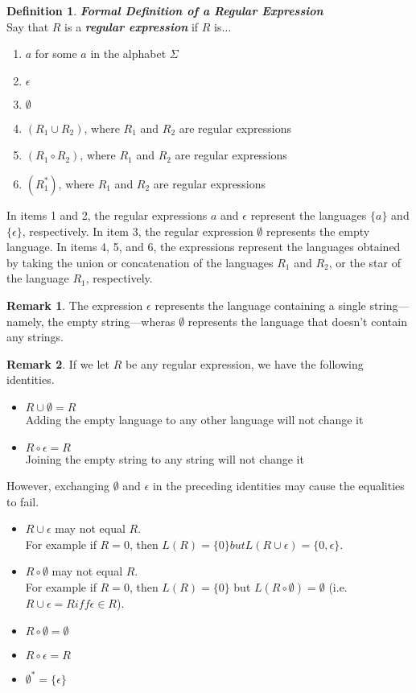 \documentclass{article}
\theoremstyle{definition}
\newtheorem{definition}{Definition}[section]
\newtheorem*{remark}{Remark}
\newcommand{\define}[1]{\textbf{\textit{#1}}}
\begin{document}
\begin{definition}{\define{Formal Definition of a Regular Expression}}
  \\ Say that $R$ is a \define{regular expression} if $R$ is$\dots$ 
  \begin{enumerate}
    \item $a$ for some $a$ in the alphabet $\Sigma$ 
    \item $\epsilon$ 
    \item $\emptyset$ 
    \item $(R_1 \cup R_2)$, where $R_1$ and $R_2$ are regular expressions 
    \item $(R_1 \circ R_2)$, where $R_1$ and $R_2$ are regular expressions 
    \item $(R_{1}^{*})$, where $R_1$ and $R_2$ are regular expressions 
  \end{enumerate}
  In items 1 and 2, the regular expressions $a$ and $\epsilon$ represent the languages $\{a\}$ and $\{\epsilon \}$, respectively. In item 3, the regular expression $\emptyset$ represents the empty language. In items 4, 5, and 6, the expressions represent the languages obtained by taking the union or concatenation of the languages $R_1$ and $R_2$, or the star of the language $R_1$, respectively.  
\end{definition}

\begin{remark}
  The expression $\epsilon$ represents the language containing a single string---namely, the empty string---wheras $\emptyset$ represents the language that doesn't contain any strings. 
\end{remark}

\begin{remark}
  If we let $R$ be any regular expression, we have the following identities. 
  \begin{itemize}
    \item $R \cup \emptyset = R$ \\ Adding the empty language to any other language will not change it 
    \item $R \circ \epsilon = R$ \\ Joining the empty string to any string will not change it
  \end{itemize}
  However, exchanging $\emptyset$ and $\epsilon$ in the preceding identities may cause the equalities to fail. 
  \begin{itemize}
    \item $R \cup \epsilon$ may not equal $R$. \\ For example if $R = 0$, then $L(R) = \{0\} but L(R \cup \epsilon) = \{0,\epsilon \}$. 
    \item $R \circ \emptyset$ may not equal $R$. \\ For example if $R = 0$, then $L(R) = \{0\}$ but $L(R \circ \emptyset) = \emptyset$ (i.e. $R \cup \epsilon = R iff \epsilon \in R$). 
    \item $R \circ \emptyset = \emptyset$ 
    \item $R \circ \epsilon = R$ 
    \item $\emptyset^{*} = \{\epsilon\}$ 
  \end{itemize}
\end{remark}
\end{document}
